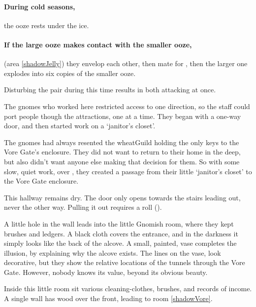 \begin{multicols}{2}
\paragraph{During cold seasons,}
the ooze rests under the ice.

\paragraph{If the large ooze makes contact with the smaller ooze,}
(area \vref{shadowJelly})
they envelop each other, then mate for , then the larger one explodes into six copies of the smaller ooze.

Disturbing the pair during this time results in  both attacking at once.


\begin{exampletext}
  The gnomes who worked here restricted access to one direction, so the staff could port people though the attractions, one at a time.
  They began with a one-way door, and then started work on a `janitor's closet'.

  The gnomes had always resented the \gls{wheatGuild} holding the only keys to the Vore Gate's enclosure.
  They did not want to return to their home in the \gls{deep}, but also didn't want anyone else making that decision for them.
  So with some slow, quiet work, over , they created a passage from their little `janitor's closet' to the Vore Gate enclosure.
\end{exampletext}

This hallway remains dry.
The door only opens towards the stairs leading out, never the other way.
Pulling it out requires a  roll (\tn[11]).

A little hole in the wall leads into the little Gnomish room, where they kept brushes and ledgers.
A black cloth covers the entrance, and in the darkness it simply looks like the back of the alcove.
A small, painted, vase completes the illusion, by explaining why the alcove exists.
The lines on the vase, look decorative, but they show the relative locations of the tunnels through the Vore Gate.
However, nobody knows its value, beyond its obvious beauty.


Inside this little room sit various cleaning-clothes, brushes, and records of income.
A single wall has wood over the front, leading to room \vref{shadowVore}.


\end{multicols}
